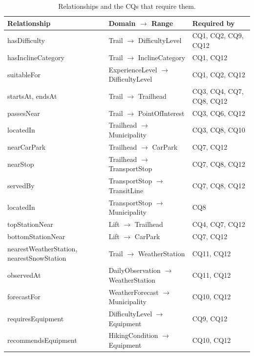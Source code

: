 \begin{table}[h!]
\centering
\small
\renewcommand{\arraystretch}{1.25}
\begin{tabularx}{\linewidth}{|>{\raggedright\arraybackslash}p{3.8cm}|>{\raggedright\arraybackslash}p{5.6cm}|>{\raggedright\arraybackslash}X|}
\hline
\textbf{Relationship} & \textbf{Domain $\rightarrow$ Range} & \textbf{Required by} \\ \hline
hasDifficulty & Trail $\rightarrow$ DifficultyLevel & CQ1, CQ2, CQ9, CQ12 \\ \hline
hasInclineCategory & Trail $\rightarrow$ InclineCategory & CQ1, CQ12 \\ \hline
suitableFor & ExperienceLevel $\rightarrow$ DifficultyLevel & CQ1, CQ2, CQ12 \\ \hline
startsAt, endsAt & Trail $\rightarrow$ Trailhead & CQ3, CQ4, CQ7, CQ8, CQ12 \\ \hline
passesNear & Trail $\rightarrow$ PointOfInterest & CQ3, CQ6, CQ12 \\ \hline
locatedIn & Trailhead $\rightarrow$ Municipality & CQ3, CQ8, CQ10 \\ \hline
nearCarPark & Trailhead $\rightarrow$ CarPark & CQ7, CQ12 \\ \hline
nearStop & Trailhead $\rightarrow$ TransportStop & CQ7, CQ8, CQ12 \\ \hline
servedBy & TransportStop $\rightarrow$ TransitLine & CQ7, CQ8, CQ12 \\ \hline
locatedIn & TransportStop $\rightarrow$ Municipality & CQ8 \\ \hline
topStationNear & Lift $\rightarrow$ Trailhead & CQ4, CQ7, CQ12 \\ \hline
bottomStationNear & Lift $\rightarrow$ CarPark & CQ7, CQ12 \\ \hline
nearestWeatherStation, nearestSnowStation & Trail $\rightarrow$ WeatherStation & CQ11, CQ12 \\ \hline
observedAt & DailyObservation $\rightarrow$ WeatherStation & CQ11, CQ12 \\ \hline
forecastFor & WeatherForecast $\rightarrow$ Municipality & CQ10, CQ12 \\ \hline
requiresEquipment & DifficultyLevel $\rightarrow$ Equipment & CQ9, CQ12 \\ \hline
recommendsEquipment & HikingCondition $\rightarrow$ Equipment & CQ10, CQ12 \\ \hline
\end{tabularx}
\caption{Relationships and the CQs that require them.}
\label{tab:relationships}
\end{table}

